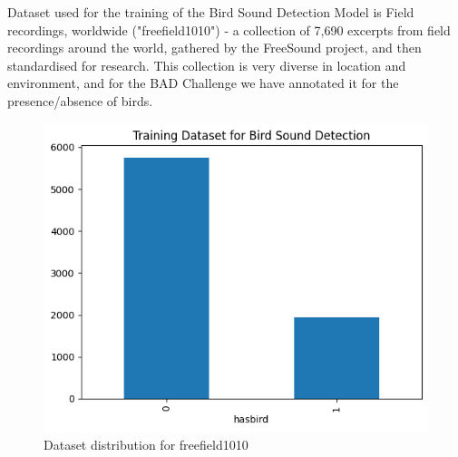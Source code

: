 Dataset used for the training of the Bird Sound Detection Model is Field
recordings, worldwide ("freefield1010") - a collection of 7,690 excerpts from
field recordings around the world, gathered by the FreeSound project, and then
standardised for research. This collection is very diverse in location and
environment, and for the BAD Challenge we have annotated it for the
presence/absence of birds.
\begin{figure}[h!]
    \centering
    \includegraphics[scale=0.45]{images/det_trainingdataset.png}
    \caption{Dataset distribution for freefield1010}
    \label{fig:freefield1010 dataset}
\end{figure}

